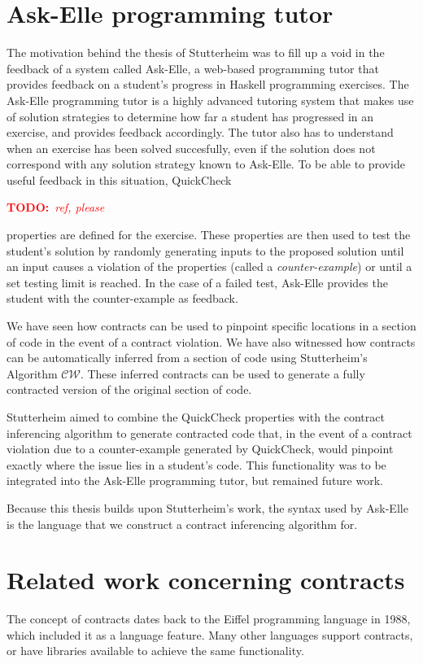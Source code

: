 \documentclass[10pt]{report}
\newcommand{\CW}{$\mathcal{CW}$}
\newcommand{\annotate}[3]{
	\begin{scriptsize}
	\textcolor{#1}{\textbf{#2}~\textit{#3}}
	\end{scriptsize}\newline}
\newcommand{\todo}[1]{\annotate{red} {TODO:} {#1}}
\begin{document}
\section{Ask-Elle programming tutor}
The motivation behind the thesis of Stutterheim was to fill up a void in the feedback of a system called Ask-Elle, a web-based programming tutor that provides feedback on a student's progress in Haskell programming exercises.
The Ask-Elle programming tutor is a highly advanced tutoring system that makes use of solution strategies to determine how far a student has progressed in an exercise, and provides feedback accordingly.
The tutor also has to understand when an exercise has been solved succesfully, even if the solution does not correspond with any solution strategy known to Ask-Elle.
To be able to provide useful feedback in this situation, QuickCheck \todo{ref, please} properties are defined for the exercise.
These properties are then used to test the student's solution by randomly generating inputs to the proposed solution until an input causes a violation of the properties (called a \textit{counter-example}) or until a set testing limit is reached.
In the case of a failed test, Ask-Elle provides the student with the counter-example as feedback.

We have seen how contracts can be used to pinpoint specific locations in a section of code in the event of a contract violation.
We have also witnessed how contracts can be automatically inferred from a section of code using Stutterheim's Algorithm \CW.
These inferred contracts can be used to generate a fully contracted version of the original section of code.

Stutterheim aimed to combine the QuickCheck properties with the contract inferencing algorithm to generate contracted code that, in the event of a contract violation due to a counter-example generated by QuickCheck, would pinpoint exactly where the issue lies in a student's code.
This functionality was to be integrated into the Ask-Elle programming tutor, but remained future work.

Because this thesis builds upon Stutterheim's work, the syntax used by Ask-Elle is the language that we construct a contract inferencing algorithm for.

\section{Related work concerning contracts}
The concept of contracts dates back to the Eiffel programming language \cite{Meyer:1988wp} in 1988, which included it as a language feature.
Many other languages support contracts, or have libraries available to achieve the same functionality.
\end{document}
